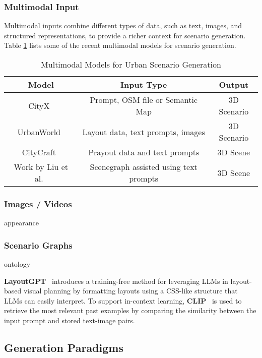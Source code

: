 \documentclass{article}
\begin{document}
\subsubsection{Multimodal Input}

Multimodal inputs combine different types of data, such as text, images, and structured representations, to provide a richer context for scenario generation. Table \ref{tab:multimodal_models} lists some of the recent multimodal models for scenario generation.

\begin{table}[ht]
\centering
    \begin{tabular}{|c|c|c|}
    \hline
    \textbf{Model} & \textbf{Input Type} & \textbf{Output} \\ \hline
    CityX~\cite{zhang2024cityx} & Prompt, OSM file or Semantic Map & 3D Scenario \\ \hline
    UrbanWorld~\cite{shang2024urbanworld} & Layout data, text prompts, images & 3D Scenario \\ \hline
    CityCraft~\cite{deng2024citycraft} & Prayout data and text prompts & 3D Scene \\ \hline
    Work by Liu et al.~\cite{liu2025controllable} & Scenegraph assisted using text prompts & 3D Scene \\ \hline
    \end{tabular}
\caption{Multimodal Models for Urban Scenario Generation}
\label{tab:multimodal_models}


\subsubsection{Images / Videos}
appearance

\subsubsection{Scenario Graphs}
ontology

\textbf{LayoutGPT}~\cite{feng2023layoutgpt} introduces a training-free method for leveraging LLMs in layout-based visual planning by formatting layouts using a CSS-like structure that LLMs can easily interpret. To support in-context learning, \textbf{CLIP}~\cite{radford2021learning} is used to retrieve the most relevant past examples by comparing the similarity between the input prompt and stored text-image pairs.

\subsection{Generation Paradigms}


\end{table}
\end{document}
